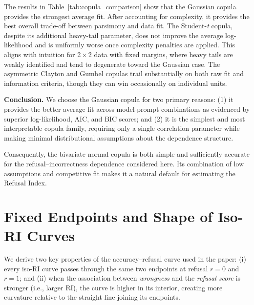 The results in Table~\ref{tab:copula_comparison} show that the Gaussian copula provides the strongest average fit. After accounting for complexity, it provides the best overall trade-off between parsimony and data fit. The Student-\emph{t} copula, despite its additional heavy-tail parameter, does not improve the average log-likelihood and is uniformly worse once complexity penalties are applied. This aligns with intuition for 2\,$\times$\,2 data with fixed margins, where heavy tails are weakly identified and tend to degenerate toward the Gaussian case. The asymmetric Clayton and Gumbel copulas trail substantially on both raw fit and information criteria, though they can win occasionally on individual units.

\noindent\textbf{Conclusion.} We choose the Gaussian copula for two primary reasons: (1) it provides the better average fit across model-prompt combinations as evidenced by superior log-likelihood, AIC, and BIC scores; and (2) it is the simplest and most interpretable copula family, requiring only a single correlation parameter while making minimal distributional assumptions about the dependence structure.

Consequently, the bivariate normal copula is both simple and sufficiently accurate for the refusal--incorrectness dependence considered here. Its combination of low assumptions and competitive fit makes it a natural default for estimating the Refusal Index.

\section{Fixed Endpoints and Shape of Iso-RI Curves}
\label{app:iso_ri_shape}

We derive two key properties of the accuracy--refusal curve used in the paper:
(i) every iso-RI curve passes through the same two endpoints at refusal \(r=0\) and \(r=1\); and
(ii) when the association between \emph{wrongness} and the \emph{refusal score} is stronger (i.e., larger RI), the curve is higher in its interior, creating more curvature relative to the straight line joining its endpoints.


